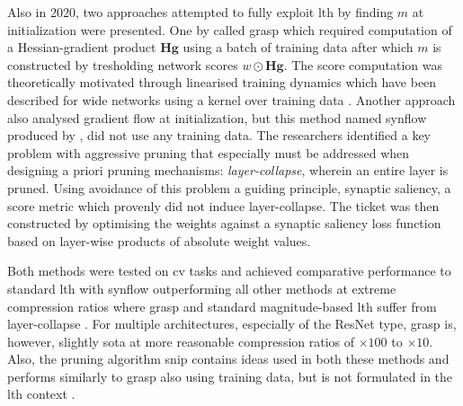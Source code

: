 \documentclass[12pt,fleqn,twocolumn]{article}
\begin{document}
Also in 2020, two approaches attempted to fully exploit \acrshort{lth} by finding $m$ at initialization were presented.
One by \textcite{Wang2020PickingWT} called \acrfull{grasp} which required computation of a Hessian-gradient product $\mathbf H \mathbf g$ using a batch of training data after which $m$ is constructed by tresholding network scores $w \odot \mathbf H \mathbf g$.
The score computation was theoretically motivated through linearised training dynamics \cite[Chap. 4.1]{Wang2020PickingWT} which have been described for wide networks using a kernel over training data \cite{Lee2019WideNN}.
Another approach also analysed gradient flow at initialization, but this method named \acrfull{synflow} produced by \textcite{Tanaka2020PruningNN}, did not use any training data.
The researchers identified a key problem with aggressive pruning that especially must be addressed when designing a priori pruning mechanisms: \emph{layer-collapse}, wherein an entire layer is pruned.
Using avoidance of this problem a guiding principle, synaptic saliency, a score metric which provenly did not induce layer-collapse.
The ticket was then constructed by optimising the weights against a synaptic saliency loss function based on layer-wise products of absolute weight values.

Both methods were tested on \acrshort{cv} tasks and achieved comparative performance to standard \acrshort{lth} with \acrshort{synflow} outperforming all other methods at extreme compression ratios where \acrshort{grasp} and standard magnitude-based \acrshort{lth} suffer from layer-collapse \cite[Chap. 7]{Tanaka2020PruningNN}.
For multiple architectures, especially of the ResNet type, \acrshort{grasp} is, however, slightly \acrshort{sota} at more reasonable compression ratios of $\times 100$ to $\times 10$\cite[Tab. 4]{Wang2020PickingWT}\cite[Fig. 6]{Tanaka2020PruningNN}.
Also, the pruning algorithm \acrfull{snip} contains ideas used in both these methods and performs similarly to \acrshort{grasp} also using training data, but is not formulated in the \acrshort{lth} context \cite{Lee2019SNIPSN}.
\end{document}
